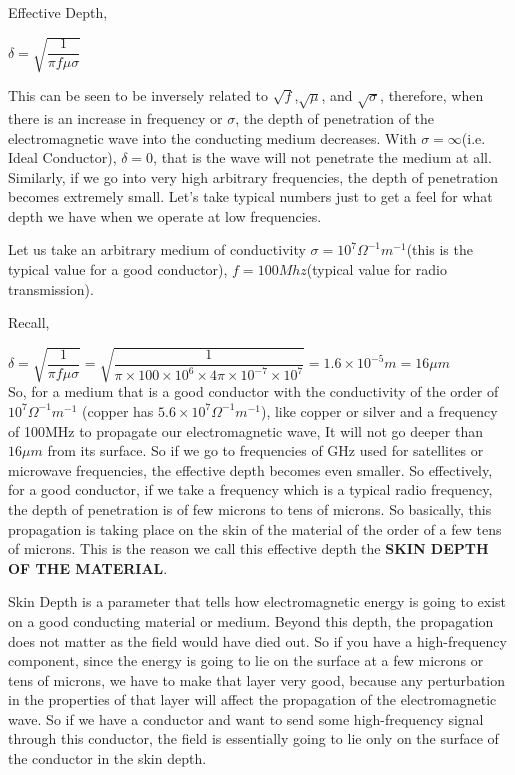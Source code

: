 Effective Depth, \begin{center}
$\delta=\sqrt{\dfrac{1}{\pi f \mu\sigma}}$
\end{center}

This can be seen to be inversely related to $\sqrt{f}$,$\sqrt{\mu}$, and $\sqrt{{\sigma}}$, therefore, when there is an increase in frequency or $\sigma$, the depth of penetration of the electromagnetic wave into the conducting medium decreases. With $\sigma=\infty$(i.e. Ideal Conductor), $\delta=0$, that is the wave will not penetrate the medium at all. Similarly, if we go into very high arbitrary frequencies, the depth of penetration becomes extremely small. Let's take typical numbers just to get a feel for what depth we have when we operate at low frequencies.

Let us take an arbitrary medium of conductivity $\sigma=10^{7}\Omega^{-1}m^{-1}$(this is the typical value for a good conductor), $f=100Mhz$(typical value for radio transmission).

Recall,

$\delta=\sqrt{\dfrac{1}{\pi f\mu\sigma}}=\sqrt{\dfrac{1}{\pi\times 100\times 10^{6}\times 4\pi\times 10^{-7}\times 10^{7}}}=1.6\times 10^{-5}m=16\mu m$
\\
So, for a medium that is a good conductor with the conductivity of the order of  $ 10^{7}\Omega^{-1}m^{-1} $ (copper has $ 5.6 \times 10^{7}\Omega^{-1}m^{-1} $), like copper or silver and a frequency of 100MHz to propagate our electromagnetic wave, It will not go deeper than $16\mu m$ from its surface. So if we go to frequencies of GHz used for satellites or microwave frequencies, the effective depth becomes even smaller. So effectively, for a good conductor, if we take a frequency which is a typical radio frequency, the depth of penetration is of few microns to tens of microns. So basically, this propagation is taking place on the skin of the material of the order of a few tens of microns. This is the reason we call this effective depth the \textbf{SKIN DEPTH OF THE MATERIAL}.

Skin Depth is a parameter that tells how electromagnetic energy is going to exist on a good conducting material or medium. Beyond this depth, the propagation does not matter as the field would have died out. So if you have a high-frequency component, since the energy is going to lie on the surface at a few microns or tens of microns, we have to make that layer very good, because any perturbation in the properties of that layer will affect the propagation of the electromagnetic wave. So if we have a conductor and want to send some high-frequency signal through this conductor, the field is essentially going to lie only on the surface of the conductor in the skin depth.

